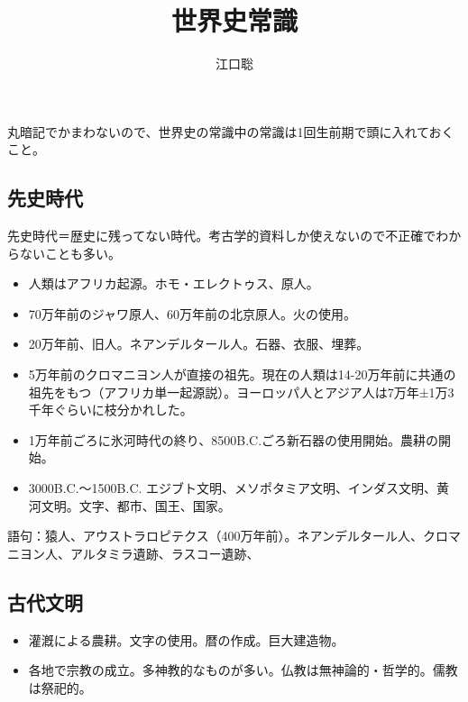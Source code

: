 \documentclass[autodetect-engine,dvipdfmx-if-dvi,ja=standard]{jsarticle} \usepackage{mystyle}
\author{江口聡}
\title{世界史常識}
\begin{document}
\maketitle
\else\chapter{}\fi


丸暗記でかまわないので、世界史の常識中の常識は1回生前期で頭に入れておくこと。


\section{先史時代}

先史時代＝歴史に残ってない時代。考古学的資料しか使えないので不正確でわからないことも多い。

\begin{itemize}
\item 人類はアフリカ起源。ホモ・エレクトゥス、原人。
  \item 70万年前のジャワ原人、60万年前の北京原人。火の使用。
  \item   20万年前、旧人。ネアンデルタール人。石器、衣服、埋葬。
  
\item 5万年前のクロマニヨン人が直接の祖先。現在の人類は14-20万年前に共通の祖先をもつ（アフリカ単一起源説）。ヨーロッパ人とアジア人は7万年±1万3千年ぐらいに枝分かれした。
\item 1万年前ごろに氷河時代の終り、8500B.C.ごろ新石器の使用開始。農耕の開始。
\item 3000B.C.〜1500B.C. エジブト文明、メソポタミア文明、インダス文明、黄河文明。文字、都市、国王、国家。

\end{itemize}

語句：猿人、アウストラロピテクス（400万年前）。ネアンデルタール人、クロマニヨン人、アルタミラ遺跡、ラスコー遺跡、


\section{古代文明}
\begin{itemize}
\item 灌漑による農耕。文字の使用。暦の作成。巨大建造物。
\item 各地で宗教の成立。多神教的なものが多い。仏教は無神論的・哲学的。儒教は祭祀的。

\end{itemize}
\end{document}
